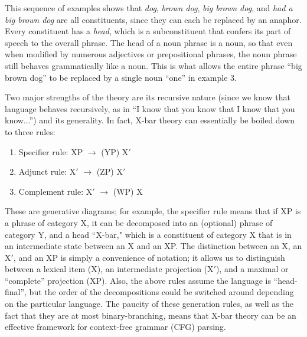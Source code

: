 \documentclass[11pt, oneside]{article}      %
\begin{document}
This sequence of examples shows that \textit{dog}, \textit{brown dog}, \textit{big brown dog}, and \textit{had a big brown dog} are all constituents, since they can each be replaced by an anaphor.  Every constituent has a \textit{head}, which is a subconstituent that confers its part of speech to the overall phrase.  The head of a noun phrase is a noun, so that even when modified by numerous adjectives or prepositional phrases, the noun phrase still behaves grammatically like a noun.  This is what allows the entire phrase ``big brown dog'' to be replaced by a single noun ``one'' in example 3.

Two major strengths of the theory are its recursive nature (since we know that language behaves recursively, as in ``I know that you know that I know that you know...'') and its generality.  In fact, X-bar theory can essentially be boiled down to three rules: 

\begin{enumerate}
\item Specifier rule: \quad XP $\rightarrow$ (YP) X$'$
\item Adjunct rule:   \quad  X$'$ $\rightarrow$ (ZP) X$'$
\item Complement rule: \quad X$'$ $\rightarrow$ (WP) X
\end{enumerate}

These are generative diagrams; for example, the specifier rule means that if XP is a phrase of category X, it can be decomposed into an (optional) phrase of category Y, and a head ``X-bar," which is a constituent of category X that is in an intermediate state between an X and an XP.  The distinction between an X, an X$'$, and an XP is simply a convenience of notation; it allows us to distinguish between a lexical item (X), an intermediate projection (X$'$), and a maximal or ``complete'' projection (XP).  Also, the above rules assume the language is ``head-final'', but the order of the decompositions could be switched around depending on the particular language.  The paucity of these generation rules, as well as the fact that they are at most binary-branching, means that X-bar theory can be an effective framework for context-free grammar (CFG) parsing.
\end{document}
